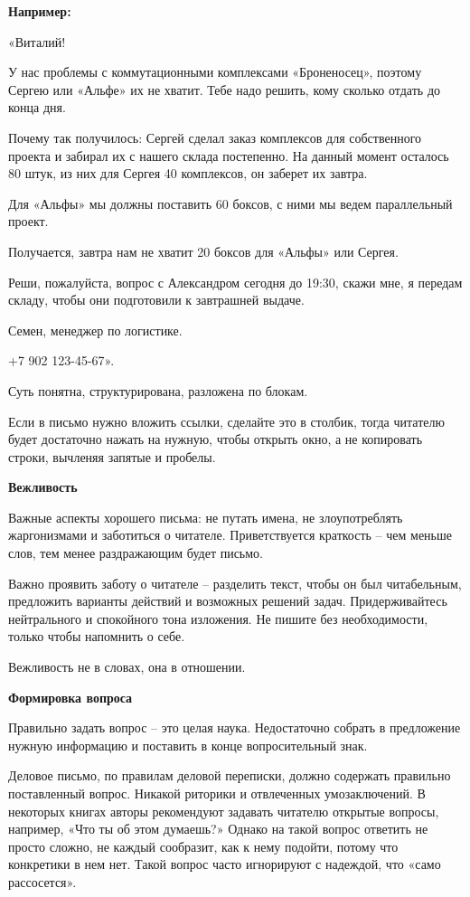 \textbf{Например:}

«Виталий!

У нас проблемы с коммутационными комплексами «Броненосец», поэтому Сергею или «Альфе» их не хватит. Тебе надо решить, кому сколько отдать до конца дня.

Почему так получилось: Сергей сделал заказ комплексов для собственного проекта и забирал их с нашего склада постепенно. На данный момент осталось 80 штук, из них для Сергея 40 комплексов, он заберет их завтра.

Для «Альфы» мы должны поставить 60 боксов, с ними мы ведем параллельный проект.

Получается, завтра нам не хватит 20 боксов для «Альфы» или Сергея.

Реши, пожалуйста, вопрос с Александром сегодня до 19:30, скажи мне, я передам складу, чтобы они подготовили к завтрашней выдаче.

Семен, менеджер по логистике.

+7 902 123-45-67».

Суть понятна, структурирована, разложена по блокам.

Если в письмо нужно вложить ссылки, сделайте это в столбик, тогда читателю будет достаточно нажать на нужную, чтобы открыть окно, а не копировать строки, вычленяя запятые и пробелы.

\textbf{Вежливость}

Важные аспекты хорошего письма: не путать имена, не злоупотреблять жаргонизмами и заботиться о читателе. Приветствуется краткость – чем меньше слов, тем менее раздражающим будет письмо.

Важно проявить заботу о читателе – разделить текст, чтобы он был читабельным, предложить варианты действий и возможных решений задач. Придерживайтесь нейтрального и спокойного тона изложения. Не пишите без необходимости, только чтобы напомнить о себе.

Вежливость не в словах, она в отношении.

\textbf{Формировка вопроса}

Правильно задать вопрос – это целая наука. Недостаточно собрать в предложение нужную информацию и поставить в конце вопросительный знак.

Деловое письмо, по правилам деловой переписки, должно содержать правильно поставленный вопрос. Никакой риторики и отвлеченных умозаключений. В некоторых книгах авторы рекомендуют задавать читателю открытые вопросы, например, «Что ты об этом думаешь?» Однако на такой вопрос ответить не просто сложно, не каждый сообразит, как к нему подойти, потому что конкретики в нем нет. Такой вопрос часто игнорируют с надеждой, что «само рассосется».

